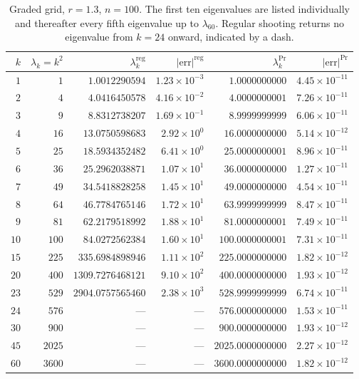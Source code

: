\documentclass[12pt,reqno]{amsart}
\numberwithin{equation}{section}
\begin{document}
\begin{table}[ht]
\centering\footnotesize
\setlength{\tabcolsep}{5pt}
\begin{tabular}{rrrrrr}
\toprule
$k$ & $\lambda_k = k^2$ & $\lambda_k^{\text{reg}}$ & $|\text{err}|^{\text{reg}}$ & $\lambda_k^{\text{Pr}}$ & $|\text{err}|^{\text{Pr}}$ \\
\midrule
$1$  & $1$    & $1.0012290594$    & $1.23\times 10^{-3}$ & $1.0000000000$    & $4.45\times 10^{-11}$ \\
$2$  & $4$    & $4.0416450578$    & $4.16\times 10^{-2}$ & $4.0000000001$    & $7.26\times 10^{-11}$ \\
$3$  & $9$    & $8.8312738207$    & $1.69\times 10^{-1}$ & $8.9999999999$    & $6.06\times 10^{-11}$ \\
$4$  & $16$   & $13.0750598683$   & $2.92\times 10^{0}$  & $16.0000000000$   & $5.14\times 10^{-12}$ \\
$5$  & $25$   & $18.5934352482$   & $6.41\times 10^{0}$  & $25.0000000001$   & $8.96\times 10^{-11}$ \\
$6$  & $36$   & $25.2962038871$   & $1.07\times 10^{1}$  & $36.0000000000$   & $1.27\times 10^{-11}$ \\
$7$  & $49$   & $34.5418828258$   & $1.45\times 10^{1}$  & $49.0000000000$   & $4.54\times 10^{-11}$ \\
$8$  & $64$   & $46.7784765146$   & $1.72\times 10^{1}$  & $63.9999999999$   & $8.47\times 10^{-11}$ \\
$9$  & $81$   & $62.2179518992$   & $1.88\times 10^{1}$  & $81.0000000001$   & $7.49\times 10^{-11}$ \\
$10$ & $100$  & $84.0272562384$   & $1.60\times 10^{1}$  & $100.0000000001$  & $7.31\times 10^{-11}$ \\
$15$ & $225$  & $335.6984898946$  & $1.11\times 10^{2}$  & $225.0000000000$  & $1.82\times 10^{-12}$ \\
$20$ & $400$  & $1309.7276468121$ & $9.10\times 10^{2}$  & $400.0000000000$  & $1.93\times 10^{-12}$ \\
$23$ & $529$  & $2904.0757565460$ & $2.38\times 10^{3}$  & $528.9999999999$  & $6.74\times 10^{-11}$ \\
$24$ & $576$  & ---               & ---                  & $576.0000000000$  & $1.53\times 10^{-11}$ \\
$30$ & $900$  & ---               & ---                  & $900.0000000000$  & $1.93\times 10^{-12}$ \\
$45$ & $2025$ & ---               & ---                  & $2025.0000000000$ & $2.27\times 10^{-12}$ \\
$60$ & $3600$ & ---               & ---                  & $3600.0000000000$ & $1.82\times 10^{-12}$ \\
\bottomrule
\end{tabular}
\caption{Graded grid, $r = 1.3$, $n = 100$. The first ten eigenvalues are listed individually and thereafter every fifth eigenvalue up to $\lambda_{60}$. Regular shooting returns no eigenvalue from $k = 24$ onward, indicated by a dash.}
\label{tab:graded}
\end{table}
\end{document}

